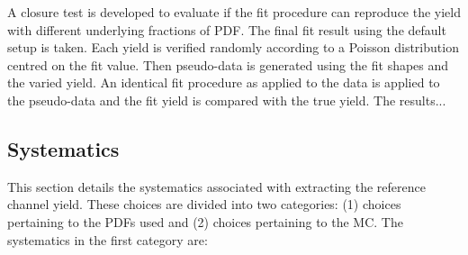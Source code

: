A closure test is developed to evaluate if the fit procedure can reproduce the yield with different underlying fractions of PDF. The final fit result using the default setup is taken. Each yield is verified randomly according to a Poisson distribution centred on the fit value. Then pseudo-data is generated using the fit shapes and the varied yield. An identical fit procedure as applied to the data is applied to the pseudo-data and the fit yield is compared with the true yield. The results...

\subsection{Systematics}
\label{subsec:refFit_systematics}

This section details the systematics associated with extracting the reference channel yield. These choices are divided into two categories: (1) choices pertaining to the PDFs used and (2) choices pertaining to the MC. The systematics in the first category are:

